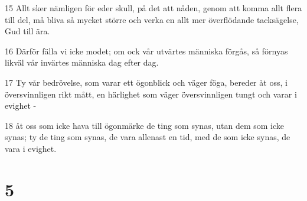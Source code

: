 \par 15 Allt sker nämligen för eder skull, på det att nåden, genom att komma allt flera till del, må bliva så mycket större och verka en allt mer överflödande tacksägelse, Gud till ära.
\par 16 Därför fälla vi icke modet; om ock vår utvärtes människa förgås, så förnyas likväl vår invärtes människa dag efter dag.
\par 17 Ty vår bedrövelse, som varar ett ögonblick och väger föga, bereder åt oss, i översvinnligen rikt mått, en härlighet som väger översvinnligen tungt och varar i evighet -
\par 18 åt oss som icke hava till ögonmärke de ting som synas, utan dem som icke synas; ty de ting som synas, de vara allenast en tid, med de som icke synas, de vara i evighet.

\chapter{5}

